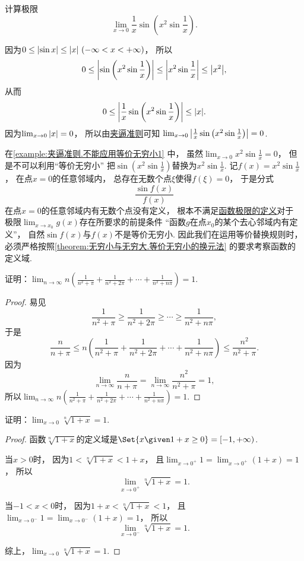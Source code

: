 \begin{example}\label{example:夹逼准则.不能应用等价无穷小1}
计算极限\[
	\lim_{x\to0} \frac1x \sin\left(x^2 \sin\frac1x\right).
\]
\begin{solution}
因为\(0\leq\abs{\sin x}\leq\abs{x}\ (-\infty<x<+\infty)\)，
所以\[
	0 \leq \abs{\sin\left(x^2 \sin\frac1x\right)}
	\leq \abs{x^2 \sin\frac1x}
	\leq \abs{x^2},
\]
从而\[
	0 \leq \abs{\frac1x \sin\left(x^2 \sin\frac1x\right)} \leq \abs{x}.
\]
因为\(\lim_{x\to0} \abs{x} = 0\)，
所以由\hyperref[theorem:数列极限.夹逼准则]{夹逼准则}可知
\(\lim_{x\to0} \abs{\frac1x \sin\left(x^2 \sin\frac1x\right)} = 0\).
\end{solution}
\end{example}
\begin{remark}
在\cref{example:夹逼准则.不能应用等价无穷小1} 中，
虽然\(\lim_{x\to0} x^2 \sin\frac1x = 0\)，
但是不可以利用“等价无穷小”
把\(\sin\left(x^2 \sin\frac1x\right)\)替换为\(x^2 \sin\frac1x\).
记\(f(x) = x^2 \sin\frac1x\)，
在点\(x=0\)的任意邻域内，
总存在无数个点\(\xi\)使得\(f(\xi) = 0\)，
于是分式\[
	\frac{\sin f(x)}{f(x)}
\]在点\(x=0\)的任意邻域内有无数个点没有定义，
根本不满足\hyperref[definition:极限.函数极限的定义1]{函数极限的定义}对于
极限\(\lim_{x \to x_0} g(x)\)存在所要求的前提条件
“函数\(g\)在点\(x_0\)的某个去心邻域内有定义”，
自然\(\sin f(x)\)与\(f(x)\)不是等价无穷小.
因此我们在运用等价替换规则时，
必须严格按照\cref{theorem:无穷小与无穷大.等价无穷小的换元法} 的要求考察函数的定义域.
\end{remark}

\begin{example}
证明：\(\lim_{n\to\infty} n \left(\frac1{n^2+\pi}+\frac1{n^2+2\pi}+\dotsb+\frac1{n^2+n\pi}\right)=1\).
\begin{proof}
易见\[
	\frac1{n^2+\pi}
	\geq \frac1{n^2+2\pi}
	\geq \dotsb
	\geq \frac1{n^2+n\pi},
\]
于是\[
	\frac{n}{n+\pi}
	\leq
	n \left(\frac1{n^2+\pi}+\frac1{n^2+2\pi}+\dotsb+\frac1{n^2+n\pi}\right)
	\leq
	\frac{n^2}{n^2+\pi}.
\]
因为\[
	\lim_{n\to\infty} \frac{n}{n+\pi}
	= \lim_{n\to\infty} \frac{n^2}{n^2+\pi}
	= 1,
\]
所以\(\lim_{n\to\infty} n \left(\frac1{n^2+\pi}+\frac1{n^2+2\pi}+\dotsb+\frac1{n^2+n\pi}\right)=1\).
\end{proof}
\end{example}

\begin{example}
证明：\(\lim_{x\to0} \sqrt[n]{1+x} = 1\).
\begin{proof}
函数\(\sqrt[n]{1+x}\)的定义域是\(\Set{ x \given 1+x\geq 0 } = [-1,+\infty)\).

当\(x > 0\)时，
因为\(1 < \sqrt[n]{1+x} < 1+x\)，
且\(\lim_{x\to0^+} 1 = \lim_{x\to0^+}(1+x) = 1\)，
所以\[
	\lim_{x\to0^+} \sqrt[n]{1+x} = 1.
\]

当\(-1 < x < 0\)时，
因为\(1+x < \sqrt[n]{1+x} < 1\)，
且\(\lim_{x\to0^-} 1 = \lim_{x\to0^-}(1+x) = 1\)，
所以\[
	\lim_{x\to0^-} \sqrt[n]{1+x} = 1.
\]

综上，\(\lim_{x\to0} \sqrt[n]{1+x} = 1\).
\end{proof}
\end{example}

